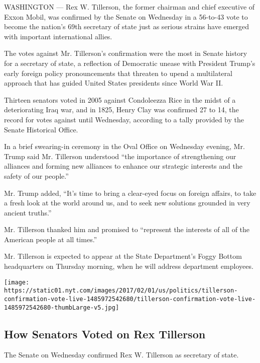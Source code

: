WASHINGTON --- Rex W. Tillerson, the former chairman and chief executive
of Exxon Mobil, was confirmed by the Senate on Wednesday in a 56-to-43
vote to become the nation's 69th secretary of state just as serious
strains have emerged with important international allies.

The votes against Mr. Tillerson's confirmation were the most in Senate
history for a secretary of state, a reflection of Democratic unease with
President Trump's early foreign policy pronouncements that threaten to
upend a multilateral approach that has guided United States presidents
since World War II.

Thirteen senators voted in 2005 against Condoleezza Rice in the midst of
a deteriorating Iraq war, and in 1825, Henry Clay was confirmed 27 to
14, the record for votes against until Wednesday, according to a tally
provided by the Senate Historical Office.

In a brief swearing-in ceremony in the Oval Office on Wednesday evening,
Mr. Trump said Mr. Tillerson understood ``the importance of
strengthening our alliances and forming new alliances to enhance our
strategic interests and the safety of our people.''

Mr. Trump added, ``It's time to bring a clear-eyed focus on foreign
affairs, to take a fresh look at the world around us, and to seek new
solutions grounded in very ancient truths.''

Mr. Tillerson thanked him and promised to ``represent the interests of
all of the American people at all times.''

Mr. Tillerson is expected to appear at the State Department's Foggy
Bottom headquarters on Thursday morning, when he will address department
employees.

\href{https://www.nytimes.com/interactive/2017/02/01/us/politics/tillerson-confirmation-vote-live.html}{}

\texttt{[image: https://static01.nyt.com/images/2017/02/01/us/politics/tillerson-confirmation-vote-live-1485972542680/tillerson-confirmation-vote-live-1485972542680-thumbLarge-v5.jpg]}

\hypertarget{how-senators-voted-on-rex-tillerson}{%
\subsection{How Senators Voted on Rex
Tillerson}\label{how-senators-voted-on-rex-tillerson}}

The Senate on Wednesday confirmed Rex W. Tillerson as secretary of
state.

